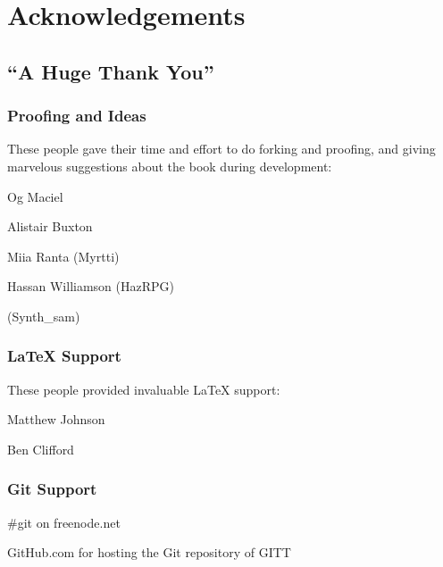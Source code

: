 \chapter{Acknowledgements}
\section{``A Huge Thank You''}

\subsection{Proofing and Ideas}
These people gave their time and effort to do forking and proofing, and giving marvelous suggestions about the book during development:

Og Maciel

Alistair Buxton

Miia Ranta (Myrtti)

Hassan Williamson (HazRPG)

(Synth\_sam)

\subsection{\LaTeX{} Support}
These people provided invaluable \LaTeX{} support:

Matthew Johnson

Ben Clifford

\subsection{Git Support}
\#git on freenode.net

GitHub.com for hosting the Git repository of GITT
